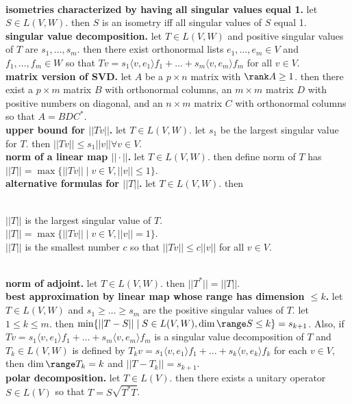 	\\ \textbf{isometries characterized by having all singular values equal 1. } let $S \in L(V,W)$. then $S$ is an isometry iff all singular values of $S$ equal 1. 
	\\ \textbf{singular value decomposition. } let $T \in L(V,W)$ and positive singular values of $T$ are $s_1,\dots,s_m$. then there exist orthonormal lists $e_1,\dots,e_m \in V$ and $f_1,\dots,f_m \in W$ so that $Tv = s_1 \langle v,e_1 \rangle f_1 + \dots + s_m \langle v,e_m \rangle f_m$ for all $v \in V$. 
	\\ \textbf{matrix version of SVD. } let $A$ be a $p \times n$ matrix with $\rank A \geq 1$. then there exist a $p \times m$ matrix $B$ with orthonormal columns, an $m \times m$ matrix $D$ with positive numbers on diagonal, and an $n \times m$ matrix $C$ with orthonormal columns so that $A=BDC^*$. 
	\\ \textbf{upper bound for $||Tv||$. } let $T \in L(V,W)$. let $s_1$ be the largest singular value for $T$. then $||Tv|| \leq s_1||v|| \forall v \in V$.
	\\ \textbf{norm of a linear map $||\cdot||$. } let $T \in L(V,W)$. then define norm of $T$ has $||T|| = \max\{||Tv|| \mid v \in V, ||v|| \leq 1\}$. 
	\\ \textbf{alternative formulas for $||T||$. } let $T \in L(V,W)$. then
	\begin{enumerate}
		\\ $||T||$ is the largest singular value of $T$. 
		\\ $||T|| = \max\{||Tv|| \mid v \in V, ||v||=1\}$. 
		\\ $||T||$ is the smallest number $c$ so that $||Tv|| \leq c||v||$ for all $v \in V$. 
	\end{enumerate}
	\\ \textbf{norm of adjoint. } let $T \in L(V,W)$. then $||T^*|| = ||T||$. 
	\\ \textbf{best approximation by linear map whose range has dimension $\leq k$. } let $T \in L(V,W)$ and $s_1 \geq \dots \geq s_m$ are the positive singular values of $T$. let $1 \leq k \leq m$. then $\min\{||T-S|| \mid S \in L(V,W), \dim\range S \leq k\} = s_{k+1}$. Also, if $Tv = s_1 \langle v,e_1 \rangle f_1 + \dots + s_m \langle v,e_m \rangle f_m$ is a singular value decomposition of $T$ and $T_k \in L(V,W)$ is defined by $T_kv = s_1 \langle v,e_1 \rangle f_1 + \dots + s_k \langle v,e_k \rangle f_k$ for each $v \in V$, then $\dim\range T_k = k$ and $||T-T_k|| = s_{k+1}$. 
	\\ \textbf{polar decomposition. } let $T \in L(V)$. then there exists a unitary operator $S \in L(V)$ so that $T = S\sqrt{T^*T}$. 
